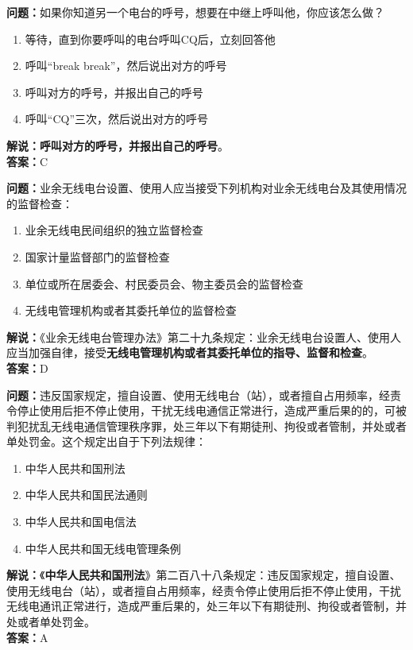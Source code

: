 \bigskip


\noindent\textbf{问题：}如果你知道另一个电台的呼号，想要在中继上呼叫他，你应该怎么做？
\begin{enumerate}[label=\Alph*), leftmargin=3em]
	\item 等待，直到你要呼叫的电台呼叫CQ后，立刻回答他
	\item 呼叫“break break”，然后说出对方的呼号
	\item 呼叫对方的呼号，并报出自己的呼号
	\item 呼叫“CQ”三次，然后说出对方的呼号
\end{enumerate}
\noindent\textbf{解说：}\textbf{呼叫对方的呼号，并报出自己的呼号}。\\\noindent\textbf{答案：}C



\bigskip


\noindent\textbf{问题：}业余无线电台设置、使用人应当接受下列机构对业余无线电台及其使用情况的监督检查：
\begin{enumerate}[label=\Alph*), leftmargin=3em]
	\item 业余无线电民间组织的独立监督检查
	\item 国家计量监督部门的监督检查
	\item 单位或所在居委会、村民委员会、物主委员会的监督检查
	\item 无线电管理机构或者其委托单位的监督检查
\end{enumerate}
\noindent\textbf{解说：}《业余无线电台管理办法》第二十九条规定：业余无线电台设置人、使用人应当加强自律，接受\textbf{无线电管理机构或者其委托单位的指导、监督和检查}。\\\noindent\textbf{答案：}D



\bigskip


\noindent\textbf{问题：}违反国家规定，擅自设置、使用无线电台（站），或者擅自占用频率，经责令停止使用后拒不停止使用，干扰无线电通信正常进行，造成严重后果的的，可被判犯扰乱无线电通信管理秩序罪，处三年以下有期徒刑、拘役或者管制，并处或者单处罚金。这个规定出自于下列法规律：
\begin{enumerate}[label=\Alph*), leftmargin=3em]
	\item 中华人民共和国刑法
	\item 中华人民共和国民法通则
	\item 中华人民共和国电信法
	\item 中华人民共和国无线电管理条例
\end{enumerate}
\textbf{解说：}《\textbf{中华人民共和国刑法}》第二百八十八条规定：违反国家规定，擅自设置、使用无线电台（站），或者擅自占用频率，经责令停止使用后拒不停止使用，干扰无线电通讯正常进行，造成严重后果的，处三年以下有期徒刑、拘役或者管制，并处或者单处罚金。\\\noindent\textbf{答案：}A



